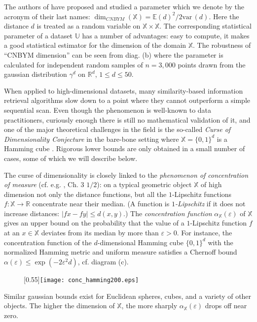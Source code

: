 \documentclass[12pt]{article}
\newcommand{\abs}[1]{\lvert#1\rvert}
\def\E{{\mathbb{E}}}
\def\R{{\mathbb R}}
\def\e{\varepsilon}
\begin{document}
The authors of \cite{CNBYM} have proposed and studied a parameter which we denote by the acronym of their last names: $\dim_{CNBYM}({\mathbb X}) =\E(d)^2/2{\mathrm{var}\,}(d)$. Here the distance $d$ is treated as a random variable on ${\mathbb X}\times{\mathbb X}$. The corresponding statistical parameter of a dataset $\mathbb U$ has a number of advantages: easy to compute, it makes a good statistical estimator for the dimension of the domain $\mathbb X$. The robustness of ``CNBYM dimension'' can be seen from diag. (b) where the parameter is calculated for independent random samples of $n=3,000$ points drawn from the gaussian distribution $\gamma^d$ on $\R^d$, $1\leq d\leq 50$.
\smallskip 

When applied to high-dimensional datasets, many similarity-based information retrieval algorithms slow down to a point where they cannot outperform a simple sequential scan. Even though the phenomenon is well-known to data practitioners, curiously enough there is still no mathematical validation of it, and one of the major theoretical challenges in the field is the so-called {\em Curse of Dimensionality Conjecture} in the bare-bone setting where ${\mathbb X}=\{0,1\}^d$ is a Hamming cube \cite{indyk:04}. Rigorous lower bounds are only obtained in a small number of cases, some of which we will describe below.

\smallskip
{}
The curse of dimensionality is closely linked to the {\em phenomenon of concentration of measure} (cf. e.g. \cite{gromov:99}, Ch. 3 $1/2$): on a typical geometric object $\mathbb X$ of high dimension not only the distance functions, but all the $1$-Lipschitz functions $f\colon {\mathbb X}\to\R$ concentrate near their median. (A function is {\em $1$-Lipschitz} if it does not increase distances: $\abs{fx-fy}\leq d(x,y)$.)
The {\em concentration function} $\alpha_{\mathbb X}(\e)$ of $\mathbb X$ gives an upper bound on the probability that the value of a $1$-Lipschitz function $f$ at an $x\in{\mathbb X}$ deviates from its median by more than $\e>0$. For instance, the concentration function of the $d$-dimensional Hamming cube $\{0,1\}^d$ with the normalized Hamming metric and uniform measure satisfies a Chernoff bound $\alpha(\e)\leq \exp(-2\e^2d)$, cf. diagram (c).
\begin{figure}[ht]
\begin{center}
\scalebox{0.55}[0.55]{\texttt{[image: conc\_hamming200.eps]}} 
\hskip 0.8cm
\end{center}
\end{figure}  Similar gaussian bounds exist for Euclidean spheres, cubes, and a variety of other objects. The higher the dimension of $\mathbb X$, the more sharply $\alpha_{\mathbb X}(\e)$ drops off near zero. 
\end{document}
